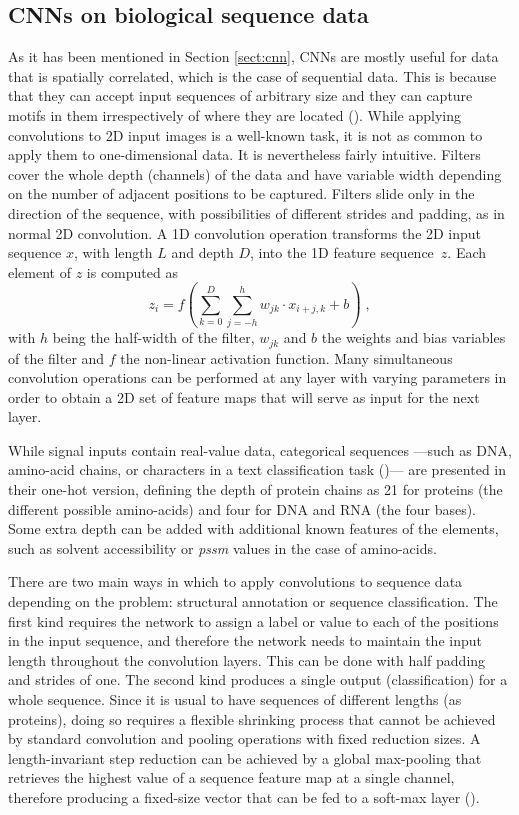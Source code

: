 \subsection{CNNs on biological sequence data}
As it has been mentioned in Section \ref{sect:cnn}, CNNs are mostly useful for data that is spatially correlated, which is the case of sequential data. This is because that they can accept input sequences of arbitrary size and they can capture motifs in them irrespectively of where they are located (\cite{Jurtz2017}). While applying convolutions to 2D input images is a well-known task, it is not as common to apply them to one-dimensional data. It is nevertheless fairly intuitive. Filters cover the whole depth (channels) of the data and have variable width depending on the number of adjacent positions to be captured. Filters slide only in the direction of the sequence, with possibilities of different strides and padding, as in normal 2D convolution. A 1D convolution operation transforms the 2D input sequence $x$, with length $L$ and depth $D$, into the 1D feature sequence~$z$. Each element of $z$ is computed as
\begin{equation}
z_i = f\left( \sum_{k=0}^{D} \sum_{j=-h}^{h} w_{jk} \cdot x_{i+j,k} + b \right) \; ,
\end{equation}
with $h$ being the half-width of the filter, $w_{jk}$ and $b$ the weights and bias variables of the filter and $f$ the non-linear activation function. Many simultaneous convolution operations can be performed at any layer with varying parameters in order to obtain a 2D set of feature maps that will serve as input for the next layer.

While signal inputs contain real-value data, categorical sequences ---such as DNA, amino-acid chains, or characters in a text classification task (\cite{Zhang2015})--- are presented in their one-hot version, defining the depth of protein chains as 21 for proteins (the different possible amino-acids) and four for DNA and RNA (the four bases). Some extra depth can be added with additional known features of the elements, such as solvent accessibility or \textit{pssm} values in the case of amino-acids.

There are two main ways in which to apply convolutions to sequence data depending on the problem: structural annotation or sequence classification. The first kind requires the network to assign a label or value to each of the positions in the input sequence, and therefore the network needs to maintain the input length throughout the convolution layers. This can be done with half padding and strides of one. The second kind produces a single output (classification) for a whole sequence. Since it is usual to have sequences of different lengths (as proteins), doing so requires a flexible shrinking process that cannot be achieved by standard convolution and pooling operations with fixed reduction sizes. A length-invariant step reduction can be achieved by a global max-pooling that retrieves the highest value of a sequence feature map at a single channel, therefore producing a fixed-size vector that can be fed to a soft-max layer (\cite{Jurtz2017}).

